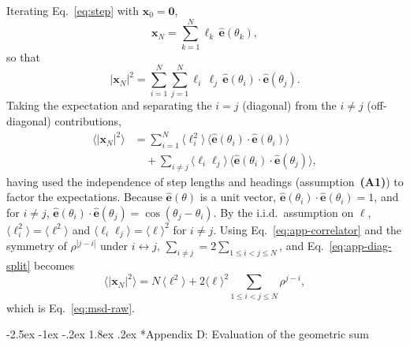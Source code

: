 \documentclass[11pt,a4paper]{article}
\makeatletter
\renewcommand\section{\@startsection{section}{1}{\z@}%
  {-2.5ex \@plus -1ex \@minus -.2ex}%
  {1.8ex \@plus.2ex}%
  {\normalfont\normalsize\bfseries\centering}}
\makeatother
\begin{document}
Iterating Eq.~\eqref{eq:step} with $\mathbf{x}_0 = \mathbf{0}$,
\begin{equation}
\mathbf{x}_N = \sum_{k=1}^{N}\ell_k\,\hat{\mathbf{e}}(\theta_k),
\end{equation}
so that
\begin{equation}
|\mathbf{x}_N|^2 = \sum_{i=1}^{N}\sum_{j=1}^{N}
\ell_i\,\ell_j\,\hat{\mathbf{e}}(\theta_i)\cdot
\hat{\mathbf{e}}(\theta_j).
\end{equation}
Taking the expectation and separating the $i=j$ (diagonal) from the
$i\neq j$ (off-diagonal) contributions,
\begin{align}
\langle|\mathbf{x}_N|^2\rangle
&= \sum_{i=1}^{N}\langle\ell_i^2\rangle\,
   \langle\hat{\mathbf{e}}(\theta_i)\cdot\hat{\mathbf{e}}(\theta_i)\rangle
 \nonumber\\
&\quad + \sum_{i\neq j}\langle\ell_i\ell_j\rangle\,
   \langle\hat{\mathbf{e}}(\theta_i)\cdot\hat{\mathbf{e}}(\theta_j)
     \rangle,
\label{eq:app-diag-split}
\end{align}
having used the independence of step lengths and headings
(assumption~\textbf{(A1)}) to factor the expectations. Because
$\hat{\mathbf{e}}(\theta)$ is a unit vector,
$\hat{\mathbf{e}}(\theta_i)\cdot\hat{\mathbf{e}}(\theta_i) = 1$,
and for $i\neq j$,
$\hat{\mathbf{e}}(\theta_i)\cdot\hat{\mathbf{e}}(\theta_j) =
\cos(\theta_j - \theta_i)$. By the i.i.d.\ assumption on $\ell$,
$\langle\ell_i^2\rangle = \langle\ell^2\rangle$ and
$\langle\ell_i\ell_j\rangle = \langle\ell\rangle^2$ for
$i\neq j$. Using Eq.~\eqref{eq:app-correlator} and the symmetry of
$\rho^{|j-i|}$ under $i\leftrightarrow j$,
$\sum_{i\neq j} = 2\sum_{1\le i<j\le N}$, and
Eq.~\eqref{eq:app-diag-split} becomes
\begin{equation}
\langle|\mathbf{x}_N|^2\rangle
 = N\,\langle\ell^2\rangle
 + 2\langle\ell\rangle^2\sum_{1\le i<j\le N}\rho^{j-i},
\end{equation}
which is Eq.~\eqref{eq:msd-raw}.

\section*{Appendix D: Evaluation of the geometric sum}
\label{app:geometric}
\end{document}
